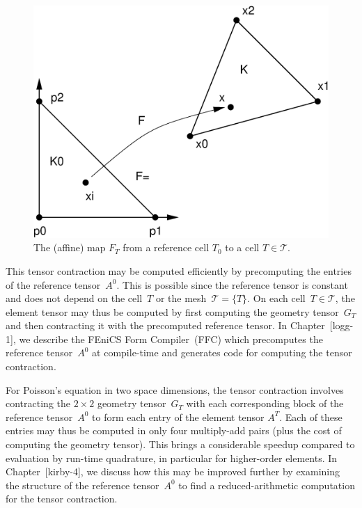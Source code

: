 \begin{figure}[htbp]
  \begin{center}
    \includegraphics[width=12cm]{chapters/kirby-8/eps/affinemap.eps}
    \caption{The (affine) map $F_T$ from a reference cell $T_0$
      to a cell $T \in \mathcal{T}$.}
    \label{fig:affinemap}
  \end{center}
\end{figure}

This tensor contraction may be computed efficiently by precomputing
the entries of the reference tensor~$A^0$. This is possible since the
reference tensor is constant and does not depend on the cell~$T$ or
the mesh~$\mathcal{T} = \{T\}$. On each cell~$T \in \mathcal{T}$, the
element tensor may thus be computed by first computing the geometry
tensor~$G_T$ and then contracting it with the precomputed reference
tensor. In Chapter~[logg-1], we describe the FEniCS Form
Compiler~(FFC) which precomputes the reference tensor~$A^0$ at
compile-time and generates code for computing the tensor contraction.

For Poisson's equation in two space dimensions, the tensor contraction
involves contracting the $2 \times 2$ geometry tensor~$G_T$ with each
corresponding block of the reference tensor~$A^0$ to form each entry
of the element tensor $A^T$. Each of these entries may thus be
computed in only four multiply-add pairs (plus the cost of computing
the geometry tensor). This brings a considerable speedup compared to
evaluation by run-time quadrature, in particular for higher-order
elements. In Chapter~[kirby-4], we discuss how this may be improved
further by examining the structure of the reference tensor~$A^0$ to
find a reduced-arithmetic computation for the tensor contraction.

